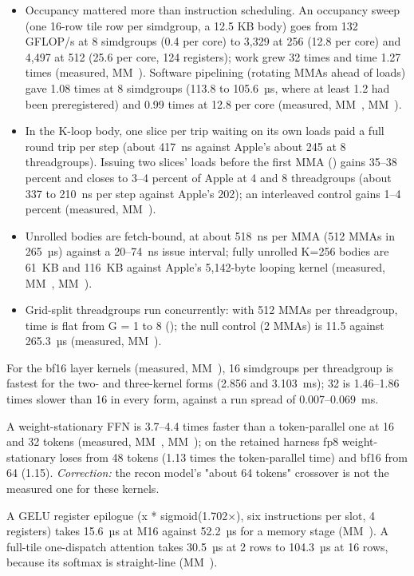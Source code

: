 \begin{itemize}
\item Occupancy mattered more than instruction scheduling. An occupancy sweep (one 16-row tile row per simdgroup, a 12.5
  KB body) goes from 132 GFLOP/s at 8 simdgroups (0.4 per core) to 3,329 at 256 (12.8 per core) and 4,497 at 512 (25.6
  per core, 124 registers); work grew 32 times and time 1.27 times (measured, MM~). Software pipelining
  (rotating MMAs ahead of loads) gave 1.08 times at 8 simdgroups (113.8 to 105.6~µs, where at least 1.2 had been
  preregistered) and 0.99 times at 12.8 per core (measured, MM~, MM~).
\item In the K-loop body, one slice per trip waiting on its own loads paid a full round trip per step (about 417~ns against
  Apple's about 245 at 8 threadgroups). Issuing two slices' loads before the first MMA () gains 35–38
  percent and closes to 3–4 percent of Apple at 4 and 8 threadgroups (about 337 to 210~ns per step against Apple's
  202); an interleaved control gains 1–4 percent (measured, MM~).
\item Unrolled bodies are fetch-bound, at about 518~ns per MMA (512 MMAs in 265~µs) against a 20–74~ns issue interval;
  fully unrolled K=256 bodies are 61~KB and 116~KB against Apple's 5,142-byte looping kernel (measured, MM~,
  MM~).
\item Grid-split threadgroups run concurrently: with 512 MMAs per threadgroup, time is flat from G = 1 to 8
  (); the null control (2 MMAs) is 11.5 against 265.3~µs (measured, MM~).
\end{itemize}

For the bf16 layer kernels (measured, MM~), 16 simdgroups per threadgroup is fastest for the two- and
three-kernel forms (2.856 and 3.103~ms); 32 is 1.46–1.86 times slower than 16 in every form, against a run spread of
0.007–0.069~ms.

A weight-stationary FFN is 3.7–4.4 times faster than a token-parallel one at 16 and 32 tokens (measured, MM~,
MM~); on the retained harness fp8 weight-stationary loses from 48 tokens (1.13 times the
token-parallel time) and bf16 from 64 (1.15). \emph{Correction:} the recon model's "about 64 tokens" crossover is not the
measured one for these kernels.

A GELU register epilogue (x * sigmoid(1.702×), six instructions per slot, 4 registers)
takes 15.6~µs at M16 against 52.2~µs for a memory stage (MM~). A full-tile one-dispatch attention takes 30.5~µs
at 2 rows to 104.3~µs at 16 rows, because its softmax is straight-line (MM~).

